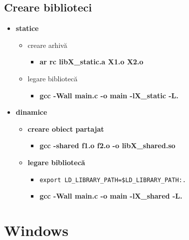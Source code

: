 \documentclass{refcard.cs.pub.ro}
\begin{document}
\begin{multicols*}{3}
\subsection{Creare biblioteci}
\begin{itemize}
  \item \textbf{statice} 
   \begin{itemize}
     \item creare arhivă
       \begin{itemize}
         \item \textbf{ar rc libX_static.a X1.o X2.o}
       \end{itemize} 
     \item legare bibliotecă
       \begin{itemize}
         \item \textbf{gcc -Wall main.c -o main -lX_static -L.}
       \end{itemize}
   \end{itemize}
  \item \textbf{dinamice}
    \begin{itemize}
      \item \textbf{creare obiect partajat}
        \begin{itemize}
          \item \textbf{gcc -shared f1.o f2.o -o libX_shared.so}
        \end{itemize}
      \item \textbf{legare bibliotecă}
        \begin{itemize}
          \item \begin{verbatim}export LD_LIBRARY_PATH=$LD_LIBRARY_PATH:. \end{verbatim}
          \item \textbf{gcc -Wall main.c -o main -lX_shared -L.}
        \end{itemize} 
    \end{itemize}
\end{itemize}
\columnbreak
\section{Windows}

\end{multicols*}
\end{document}
